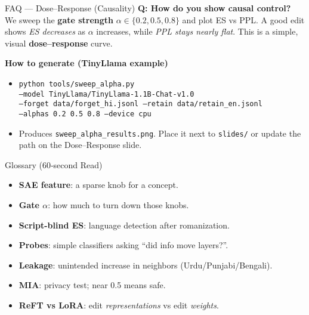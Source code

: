\documentclass[aspectratio=169]{beamer}
\begin{document}
\begin{frame}{FAQ — Dose–Response (Causality)}
\small
\textbf{Q: How do you show causal control?}\\
We sweep the \textbf{gate strength} $\alpha\in\{0.2,0.5,0.8\}$ and plot ES vs PPL. A good edit shows \emph{ES decreases} as $\alpha$ increases, while \emph{PPL stays nearly flat}. This is a simple, visual \textbf{dose–response} curve.

\vspace{2mm}

\textbf{How to generate (TinyLlama example)}
\begin{itemize}
  \item \texttt{python tools/sweep\_alpha.py \\
  --model TinyLlama/TinyLlama-1.1B-Chat-v1.0 \\
  --forget data/forget\_hi.jsonl --retain data/retain\_en.jsonl \\
  --alphas 0.2 0.5 0.8 --device cpu}
  \item Produces \texttt{sweep\_alpha\_results.png}. Place it next to \texttt{slides/} or update the path on the Dose–Response slide.
\end{itemize}
\end{frame}

\begin{frame}{Glossary (60‑second Read)}
\small
\begin{itemize}
  \item \textbf{SAE feature}: a sparse knob for a concept.
  \item \textbf{Gate $\alpha$}: how much to turn down those knobs.
  \item \textbf{Script\hyp blind ES}: language detection after romanization.
  \item \textbf{Probes}: simple classifiers asking “did info move layers?”.
  \item \textbf{Leakage}: unintended increase in neighbors (Urdu/Punjabi/Bengali).
  \item \textbf{MIA}: privacy test; near 0.5 means safe.
  \item \textbf{ReFT vs LoRA}: edit \emph{representations} vs edit \emph{weights}.
\end{itemize}
\end{frame}
\end{document}
